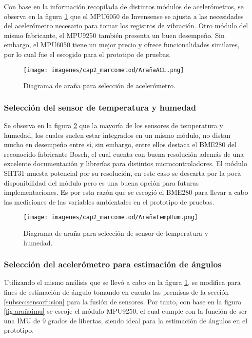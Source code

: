 Con base en la información recopilada de distintos módulos de acelerómetros, se observa en la figura \ref{fig:arañaacl} que el MPU6050 de Invensense se ajusta a las necesidades del acelerómetro necesario para tomar los registros de vibración. Otro módulo del mismo fabricante, el MPU9250 también presenta un buen desempeño. Sin embargo, el MPU6050 tiene un mejor precio y ofrece funcionalidades similares, por lo cual fue el escogido para el prototipo de pruebas.


\begin{figure}[H]
    \centering
    \texttt{[image: imagenes/cap2\_marcometod/ArañaACL.png]}
    \caption{Diagrama de araña para selección de acelerómetro.}
    \label{fig:arañaacl}
\end{figure}

\subsubsection{Selección del sensor de temperatura y humedad}

Se observa en la figura \ref{fig:arañatemphum} que la mayoría de los sensores de temperatura y humedad, los cuales suelen estar integrados en un mismo módulo, no distan mucho en desempeño entre sí, sin embargo, entre ellos destaca el BME280 del reconocido fabricante Bosch, el cual cuenta con buena resolución además de una excelente documentación y librerías para distintos microcontroladores. El módulo SHT31 muesta potencial por su resolución, en este caso se descarta por la poca disponibilidad del módulo pero es una buena opción para futuras implementaciones. Es por esta razón que se escogió el BME280 para llevar a cabo las mediciones de las variables ambientales en el prototipo de pruebas.

\begin{figure}[H]
    \centering
    \texttt{[image: imagenes/cap2\_marcometod/ArañaTempHum.png]}
    \caption{Diagrama de araña para selección de sensor de temperatura y humedad.}
    \label{fig:arañatemphum}
\end{figure}

\subsubsection{Selección del acelerómetro para estimación de ángulos}

Utilizando el mismo análisis que se llevó a cabo en la figura \ref{fig:arañaacl}, se modifica para fines de estimación de ángulo tomando en cuenta las premisas de la sección \ref{subsec:sensorfusion} para la fusión de sensores. Por tanto, con base en la figura \ref{fig:arañaimu} se escoje el módulo MPU9250, el cual cumple con la función de ser una IMU de 9 grados de libertas, siendo ideal para la estimación de ángulos en el prototipo.

